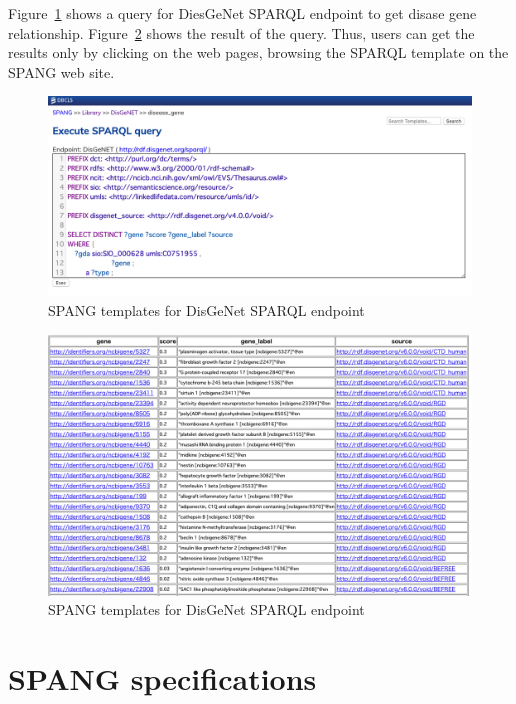 \documentclass[runningheads]{llncs}
\begin{document}
Figure~\ref{fig:spang_disease_gene_query} shows a query for DiesGeNet SPARQL endpoint to get disase gene relationship. 
Figure~\ref{fig:spang_disease_gene_result} shows the result of the query. Thus, users can get the results only by clicking on the web pages, browsing the SPARQL template on the SPANG web site.

\begin{figure}
\center
\includegraphics[width=1.0\textwidth]{spang_disease_gene_query.png}
\caption{SPANG templates for DisGeNet SPARQL endpoint}
\label{fig:spang_disease_gene_query}
\end{figure}

\begin{figure}
\center
\includegraphics[width=1.0\textwidth]{spang_disease_gene_result.png}
\caption{SPANG templates for DisGeNet SPARQL endpoint}
\label{fig:spang_disease_gene_result}
\end{figure}


\section{SPANG specifications}
\end{document}
